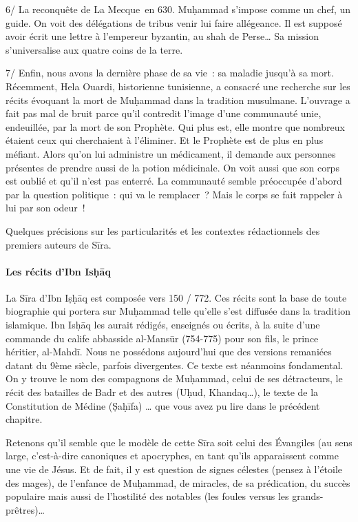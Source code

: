 6/ La reconquête de La Mecque~en 630. Muḥammad s'impose comme un chef,
un guide. On voit des délégations de tribus venir lui faire allégeance.
Il est supposé avoir écrit une lettre à l'empereur byzantin, au shah de
Perse\ldots{} Sa mission s'universalise aux quatre coins de la terre.

7/ Enfin, nous avons la dernière phase de sa vie~: sa maladie jusqu'à sa
mort. Récemment, Hela Ouardi, historienne tunisienne, a consacré une
recherche sur les récits évoquant la mort de Muḥammad dans la tradition
musulmane. L'ouvrage a fait pas mal de bruit parce qu'il contredit
l'image d'une communauté unie, endeuillée, par la mort de son
Prophète. Qui plus est, elle montre que nombreux étaient
ceux qui cherchaient à l'éliminer. Et le Prophète est de plus en plus
méfiant. Alors qu'on lui administre un médicament, il demande aux
personnes présentes de prendre aussi de la potion médicinale. On voit
aussi que son corps est oublié et qu'il n'est pas enterré. La communauté
semble préoccupée d'abord par la question politique~: qui va le
remplacer~? Mais le corps se fait rappeler à lui par son odeur~!

Quelques précisions sur les particularités et les contextes
rédactionnels des premiers auteurs de Sīra.


\paragraph{Les récits d'Ibn
Isḥāq}

La Sīra d'Ibn Iṣḥāq est composée vers 150 / 772. Ces récits sont la base
de toute biographie qui portera sur Muḥammad telle qu'elle s'est
diffusée dans la tradition islamique. Ibn Isḥāq les aurait rédigés,
enseignés ou écrits, à la suite d'une commande du calife abbasside
al-Mansūr (754-775) pour son fils, le prince héritier, al-Mahdī. Nous ne
possédons aujourd'hui que des versions remaniées datant du 9ème siècle,
parfois divergentes. Ce texte est néanmoins fondamental. On y trouve le
nom des compagnons de Muḥammad, celui de ses détracteurs, le récit des
batailles de Badr et des autres (Uḥud, Khandaq\ldots), le texte de la
Constitution de Médine (Ṣaḥīfa) \ldots{} que vous avez pu lire dans le
précédent chapitre.

Retenons qu'il semble que le modèle de cette Sīra soit celui des
Évangiles (au sens large, c'est-à-dire canoniques et apocryphes, en tant
qu'ils apparaissent comme une vie de Jésus. Et de fait, il y est
question de signes célestes (pensez à l'étoile des mages), de l'enfance
de Muḥammad, de miracles, de sa prédication, du succès populaire mais
aussi de l'hostilité des notables (les foules versus les
grands-prêtres)\ldots{}

